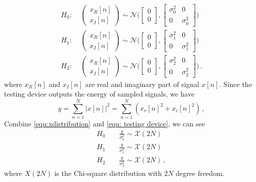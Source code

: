\begin{equation}
   \begin{split}
  H_0:\;\;\;\;\begin{pmatrix} x_R[n] \\ x_I[n] \end{pmatrix} \sim \mathcal{N}\Big( \begin{bmatrix} 0 \\ 0 \end{bmatrix}, \begin{bmatrix} \sigma_0^2 & 0\\ 0 & \sigma_0^2 \end{bmatrix} \Big)\\
  H_1:\;\;\;\;\begin{pmatrix} x_R[n] \\ x_I[n] \end{pmatrix} \sim \mathcal{N}\Big( \begin{bmatrix} 0 \\ 0 \end{bmatrix}, \begin{bmatrix} \sigma_1^2 & 0\\ 0 & \sigma_1^2 \end{bmatrix} \Big)\\
  H_2:\;\;\;\;\begin{pmatrix} x_R[n] \\ x_I[n] \end{pmatrix} \sim \mathcal{N}\Big( \begin{bmatrix} 0 \\ 0 \end{bmatrix}, \begin{bmatrix} \sigma_2^2 & 0\\ 0 & \sigma_2^2 \end{bmatrix} \Big)\,.  
\end{split}
  \label{equ:xdistribution}
\end{equation}
where $x_R[n]$ and $x_I[n]$ are real and imaginary part of signal $x[n]$.
Since the testing device outputs the energy of sampled signals, we have 
\begin{equation}
  y = \sum_{n=1}^{N}|x[n]|^2 = \sum_{n=1}^{N}(x_r[n]^2+x_i[n]^2)\,,
  \label{equ: testing device}
\end{equation}
Combine \eqref{equ:xdistribution} and \eqref{equ: testing device}, we can see 
\begin{equation} 
  \label{equ: abstract}
  \begin{split}
	H_0\;\;\;\;&\frac{y}{\sigma_0^2}\sim \mathcal{X}(2N)\\
	H_1\;\;\;\;&\frac{y}{\sigma_1^2}\sim \mathcal{X}(2N)\\
	H_2\;\;\;\;&\frac{y}{\sigma_2^2}\sim \mathcal{X}(2N)\,,
  \end{split}
\end{equation}
where $X(2N)$ is the Chi-square distribution with $2N$ degree freedom. 

